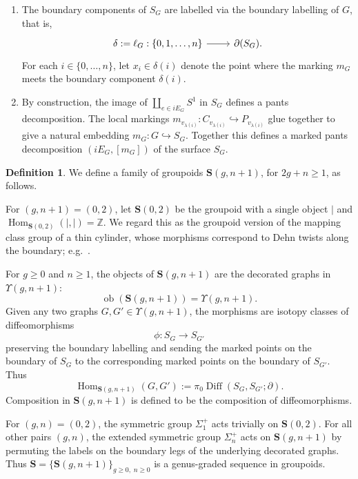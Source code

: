 \documentclass{amsart}
\newcommand{\bS}{\mathbf{S}}
\newcommand{\Hom}{\operatorname{Hom}}
\newcommand{\ob}{\operatorname{ob}}
\newcommand{\Diff}{\operatorname{Diff}}
\theoremstyle{definition}
\newtheorem{definition}[theorem]{Definition}%
\numberwithin{equation}{section}
\begin{document}
\begin{enumerate}
\item The boundary components of $S_G$ are labelled via the boundary labelling of $G$, that is,
    \[
    \begin{tikzcd}
    \delta := \ell_G : \{0,1,\ldots,n\} \arrow[r] & \partial(S_G).
    \end{tikzcd}
    \]
    For each $i\in\{0,\ldots,n\}$, let $x_i\in \delta(i)$ denote the point where the marking $m_G$ meets the boundary component $\delta(i)$.

\item     By construction, the image of $\coprod_{e\in iE_G} S^1$ in $S_G$ defines a pants decomposition.  The local markings $m_{v_{\lambda(i)}}:C_{v_{\lambda(i)}}\hookrightarrow P_{v_{\lambda(i)}}$ glue together to give a natural embedding $m_G:G\hookrightarrow S_G.$ Together this defines a marked pants decomposition $(iE_G, [m_G])$ of the surface $S_G$. 

\end{enumerate}



\begin{definition}\label{def: surface modular operad}
We define a family of groupoids $\bS(g,n+1)$, for $2g+n\geq 1$, as follows. 

For $(g,n+1)=(0,2)$, let $\bS(0,2)$ be the groupoid with a single object $|$ and $\Hom_{\bS(0,2)}(|,|)=\mathbb Z.$ We regard this as the groupoid version of the mapping class group of a thin cylinder, whose morphisms correspond to Dehn twists along the boundary; e.g.~\cite[3.1.1]{Wahl_infinite_loop_space}. 


\medskip

For $g\ge 0$ and $n\ge 1$, the objects of $\bS(g,n+1)$ are the decorated graphs in $\Upsilon(g,n+1)$:
\[
\ob(\bS(g,n+1))=\Upsilon(g,n+1).
\]
Given any two graphs $G,G'\in \Upsilon(g,n+1)$, the morphisms are isotopy classes of diffeomorphisms
\[
\phi:S_G\to S_{G'}
\]
preserving the boundary labelling and sending the marked points on the boundary of $S_G$ to the corresponding marked points on the boundary of $S_{G'}$. Thus 
\[\Hom_{\bS(g,n+1)}(G,G'):=\pi_0\Diff(S_G,S_{G'};\partial).\] 
Composition in $\bS(g,n+1)$ is defined to be the composition of diffeomorphisms.

\end{definition} 

For $(g,n)=(0,2)$, the symmetric group $\Sigma_1^+$ acts trivially on $\bS(0,2)$. For all other pairs $(g,n)$, the extended symmetric group $\Sigma_n^+$ acts on $\bS(g,n+1)$ by permuting the labels on the boundary legs of the underlying decorated graphs. Thus $\bS=\{\bS(g,n+1)\}_{g\geq 0,\; n\geq 0}$ is a genus-graded sequence in groupoids. 
\end{document}
